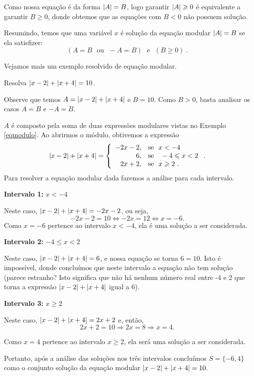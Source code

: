  Como nossa equação é da forma  $\left|A\right|= B$, logo garantir $\left|A\right|\geqslant 0$ é equivalente a garantir $B \geq 0$, donde obtemos que as equações com $B < 0$ não possuem solução.

 Resumindo, temos que uma variável $x$ é solução da equação modular $\left|A\right|= B$ se ela satisfizer:
\begin{equation*}
(A= B \ \ \ \text{ou} \ \ \ -A= B) \ \ \ \text{e} \ \ \ (B \geq 0) \ . 
\end{equation*}

 Vejamos mais um exemplo resolvido de equação modular.

 \begin{exem}
   Resolva $\left|x-2\right| + \left|x+4\right|= 10$.

   Observe que temos $A = \left|x-2\right| + \left|x+4\right|$ e $B = 10$. Como $B > 0$, basta analisar os casos $A= B$ e $-A= B$.

   $A$ é composto pela soma de duas expressões modulares vistas no Exemplo \ref{eqmodulo}. Ao abrirmos o módulo, obtivemos a expressão 
   \[ \left|x-2\right| + \left|x+4\right| = \left\{\begin{array}{rl}
      -2x-2, & \text{se} \ \ x < -4 \\
      6, & \text{se } \ \ -4 \leqslant x < 2 \\
      2x + 2, & \text{se} \ \ x \geqslant 2 \ .
     \end{array}\right..
  \]
 Para resolver a equação modular  dada faremos a análise para cada intervalo.

 \textbf{Intervalo 1:} $x < -4$

 Neste caso, $\left|x-2\right| + \left|x+4\right|= -2x-2$, ou seja, 
\begin{equation*}
-2x-2= 10 \Leftrightarrow -2x= 12 \Leftrightarrow x= -6.
\end{equation*}
 Como $x= -6$ pertence ao intervalo $x< -4$, ela é uma solução a ser considerada.

 \textbf{Intervalo 2:} $-4 \leq x < 2$

 Neste caso, $\left|x-2\right| + \left|x+4\right|= 6$, e nossa equação se torna $6= 10$. Isto é impossível, donde concluímos que neste intervalo a equação não tem solução (parece estranho? Isto significa que não há nenhum número real entre -4 e 2 que torna a expressão $\left|x-2\right| + \left|x+4\right|$ igual a 6).

 \textbf{Intervalo 3:} $x \geq 2 $

 Neste caso, $\left|x-2\right| + \left|x+4\right|= 2x + 2$ e, então,
\begin{equation*}
2x + 2= 10 \Rightarrow 2x= 8 \Rightarrow x= 4.
\end{equation*}

Como $x= 4$ pertence ao intervalo $x \geq 2$, ela será uma solução a ser considerada.

 Portanto, após a análise das soluções nos três intervalos concluímos $S=\{-6, 4\}$ como  o conjunto solução da equação modular
$\left|x-2\right| + \left|x+4\right|= 10.$
 \end{exem}


